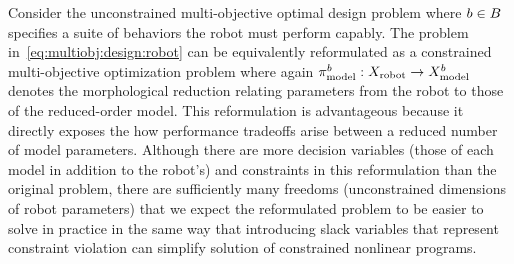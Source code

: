 \documentclass[11pt]{article}
\begin{document}
Consider the unconstrained multi-objective optimal design problem 
%
\eqnn{
\label{eq:multiobj:design:robot}
\min\set{ \performance^{\behavior}_{\robot}(\parameter_{\robot}) \mid \parameter_{\robot}\in\Parameters_{\robot},\ \behavior\in\Behaviors }
}
%
where
$b\in B$ specifies a suite of behaviors the robot must perform capably.
The problem in~\eqref{eq:multiobj:design:robot} can be equivalently reformulated as a constrained multi-objective optimization problem
%
\eqnn{
\label{eq:multiobj:design:template}
\min\set{ \performance^{\behavior}_{\template}(\parameter^{\behavior}_{\template}) \mid
\parameter^{\behavior}_{\template} = \reduction^{\behavior}_{\template}(\parameter_{\robot}),\ 
\parameter_{\robot}\in\Parameters_{\robot},\ \behavior\in\Behaviors },
}
%
where again $\pi_{\text{model}}^{b}:X_{\text{robot}}\rightarrow X_{\text{model}}^{b}$ denotes the morphological reduction relating parameters from the robot to those of the reduced-order model.
This reformulation is advantageous because it directly exposes the how performance tradeoffs arise between a reduced number of model parameters.
Although there are more decision variables (those of each model in addition to the robot's) and constraints in this reformulation than the original problem, there are sufficiently many freedoms (unconstrained dimensions of robot parameters) that we expect the reformulated problem to be easier to solve in practice 
in the same way that introducing slack variables that represent constraint violation can simplify solution of constrained nonlinear programs.

\end{document}
